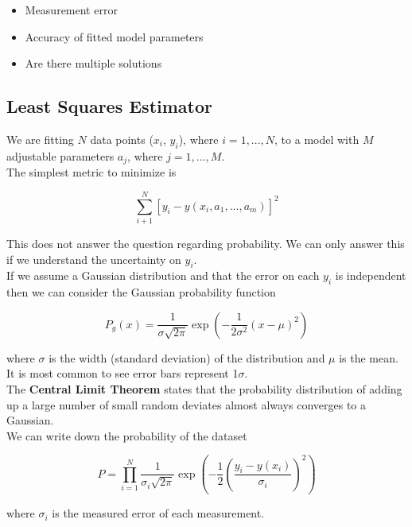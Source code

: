 \documentclass[]{article}
\begin{document}
\begin{itemize}
	\item Measurement error
	\item Accuracy of fitted model parameters
	\item Are there multiple solutions
\end{itemize}\bigbreak


\subsection{Least Squares Estimator}\bigbreak

We are fitting $N$ data points ($x_i$, $y_i$), where $i=1, ..., N$, to a model with $M$ adjustable parameters $a_j$, where $j=1, ..., M$. \\

The simplest metric to minimize is 

\[\sum_{i+1}^{N}[y_i - y(x_i, a_1, ..., a_m)]^2 \]

This does not answer the question regarding probability. We can only answer this if we understand the uncertainty on $y_i$. \\


If we assume a Gaussian distribution and that the error on each $y_i$ is independent then we can consider the Gaussian probability function

\[P_g(x) = \frac{1}{\sigma \sqrt{2\pi}}\exp(-\frac{1}{2\sigma^2}(x-\mu)^2)\]

where $\sigma$ is the width (standard deviation) of the distribution and $\mu$ is the mean.\\


It is most common to see error bars represent 1$\sigma$.\\

The \textbf{Central Limit Theorem} states that the probability distribution of adding up a large number of small random deviates almost always converges to a Gaussian.\\

We can write down the probability of the dataset 

\[P = \prod_{i=1}^{N} \frac{1}{\sigma_i \sqrt{2\pi}}\exp(-\frac{1}{2}\left(\frac{y_i - y(x_i)}{\sigma_i}\right)^2)\]

where $\sigma_i$ is the measured error of each measurement.\\
\end{document}
